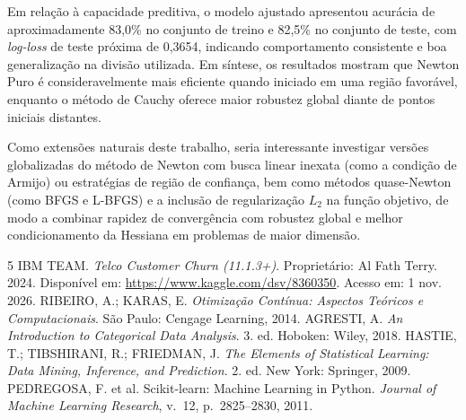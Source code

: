 \documentclass{article}
\theoremstyle{remark}
\begin{document}
Em relação à capacidade preditiva, o modelo ajustado apresentou acurácia de aproximadamente 83,0\% no conjunto de treino e 82,5\% no conjunto de teste, com \textit{log-loss} de teste próxima de 0,3654, indicando comportamento consistente e boa generalização na divisão utilizada. Em síntese, os resultados mostram que Newton Puro é consideravelmente mais eficiente quando iniciado em uma região favorável, enquanto o método de Cauchy oferece maior robustez global diante de pontos iniciais distantes.

Como extensões naturais deste trabalho, seria interessante investigar versões globalizadas do método de Newton com busca linear inexata (como a condição de Armijo) ou estratégias de região de confiança, bem como métodos quase-Newton (como BFGS e L-BFGS) e a inclusão de regularização $L_2$ na função objetivo, de modo a combinar rapidez de convergência com robustez global e melhor condicionamento da Hessiana em problemas de maior dimensão.

\begin{thebibliography}{5}
 IBM TEAM. \textit{Telco Customer Churn (11.1.3+)}. Proprietário: Al Fath Terry. 2024. Disponível em: \url{https://www.kaggle.com/dsv/8360350}. Acesso em: 1 nov. 2026.
 RIBEIRO, A.; KARAS, E. \textit{Otimização Contínua: Aspectos Teóricos e Computacionais}. São Paulo: Cengage Learning, 2014.
 AGRESTI, A. \textit{An Introduction to Categorical Data Analysis}. 3. ed. Hoboken: Wiley, 2018.
 HASTIE, T.; TIBSHIRANI, R.; FRIEDMAN, J. \textit{The Elements of Statistical Learning: Data Mining, Inference, and Prediction}. 2. ed. New York: Springer, 2009.
PEDREGOSA, F. et al. Scikit-learn: Machine Learning in Python. \textit{Journal of Machine Learning Research}, v.\ 12, p.\ 2825--2830, 2011.
\end{thebibliography}
\end{document}

